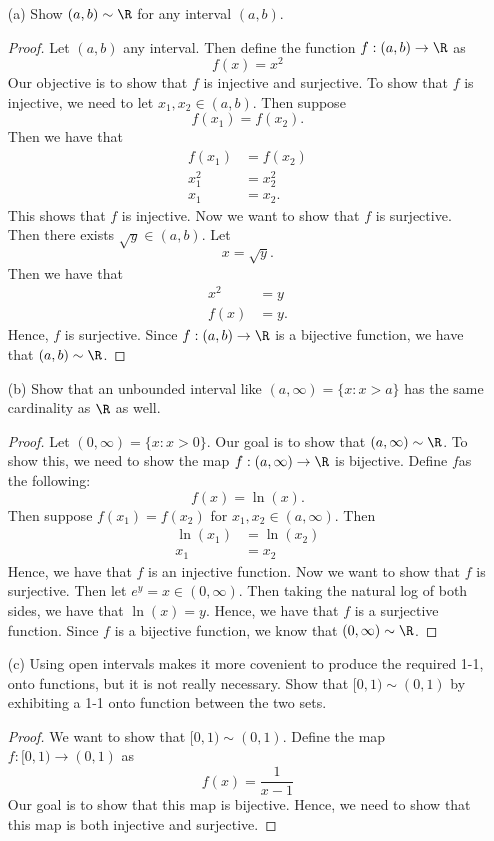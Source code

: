 \begin{enumerate}
    \item[(a)] Show \( (a,b ) \sim \R \) for any interval \( (a,b) \).  
    \begin{proof}
    Let \( (a,b) \) any interval. Then define the function \( f: (a,b) \to \R \) as 
    \[ f(x) = x^2 \]
    Our objective is to show that \( f \) is injective and surjective. To show that \( f \) is injective, we need to let \( x_1, x_2 \in (a,b) \). Then suppose 
    \[ f(x_1) = f(x_2).\]
    Then we have that 
    \begin{align*}
    f(x_1)&= f(x_2) \\
    x_1^2 &= x_2^2 \\ 
    x_1 &= x_2.
    \end{align*}
    This shows that \( f \) is injective. Now we want to show that \( f \) is surjective. Then there exists \( \sqrt{y} \in (a,b)\). Let 
    \[ x = \sqrt{y}.\]
    Then we have that 
    \begin{align*}
    x^2 &= y \\
    f(x) &= y.
    \end{align*}
    Hence, \( f \) is surjective. Since \( f: (a,b) \to \R \) is a bijective function, we have that \( (a,b) \sim \R \). 
    \end{proof}
    \item[(b)] Show that an unbounded interval like \( (a, \infty ) = \{ x: x > a \}\) has the same cardinality as \( \R \) as well.
    \begin{proof}
     Let \( (0, \infty ) = \{ x: x > 0 \}\). Our goal is to show that \( (a, \infty ) \sim \R \). To show this, we need to show the map \(f: (a, \infty ) \to \R \) is bijective. Define \( f \)as the following:
     \[ f(x) = \ln(x).\]
     Then suppose \( f(x_1) = f(x_2) \) for \( x_1, x_2 \in (a, \infty)\). Then 
    \begin{align*}
     \ln(x_1) &= \ln(x_2) \\ 
     x_1 &= x_2 
    \end{align*}
    Hence, we have that \( f\) is an injective function. Now we want to show that \( f \) is surjective. Then let \( e^{y}  = x \in (0,\infty)\). Then taking the natural log of both sides, we have that \( \ln(x) = y \). Hence, we have that \( f \) is a surjective function. Since \( f \) is a bijective function, we know that \( (0, \infty ) \sim \R \).  
    \end{proof}
    \item[(c)] Using open intervals makes it more covenient to produce the required 1-1, onto functions, but it is not really necessary. Show that \( [0,1) \sim (0,1) \) by exhibiting a 1-1 onto function between the two sets.
    \begin{proof}
        We want to show that \( [0,1) \sim (0,1) \). Define the map \( f: [0,1) \to (0,1) \) as
        \[ f(x) = \frac{1}{x-1} \]
        Our goal is to show that this map is bijective. Hence, we need to show that this map is both injective and surjective.


\end{proof}
\end{enumerate}
